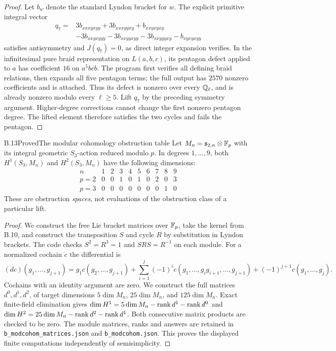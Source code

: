 \begin{proof}
Let $b_w$ denote the standard Lyndon bracket for $w$.
The explicit primitive integral vector
\[
 \begin{split}
 q_7={}&3b_{xxxyxyy}+3b_{xxxyyxy}+b_{xxyxyxy}\\
       &-3b_{xxyxyyy}-3b_{xxyyxyy}
        -3b_{xxyyyxy}-b_{xyxyxyy}
 \end{split}
\]
satisfies antisymmetry and $J(q_7)=0$, as direct integer
expansion verifies. In the infinitesimal pure braid
representation on $L(a,b,c)$, its pentagon defect applied
to $a$ has coefficient $16$ on $a^5bcb$.
The program first verifies all defining braid relations,
then expands all five pentagon terms; the full output
has $2570$ nonzero coefficients and is attached.
Thus its defect is nonzero over every $\mathbb Q_\ell$, and is
already nonzero modulo every $\ell\ge5$.
Lift $q_7$ by the preceding symmetry argument.
Higher-degree corrections cannot change the first
nonzero pentagon degree. The lifted element therefore
satisfies the two cycles and fails the pentagon.
\end{proof}

\begin{statement}{B.13}{Proved}{The modular cohomology obstruction table}
Let $M_n=\mathfrak s_{2,n}\otimes\mathbb F_p$ with its integral
geometric $S_3$-action reduced modulo $p$. In degrees
$1,\ldots,9$, both $H^1(S_3,M_n)$ and $H^2(S_3,M_n)$ have
the following dimensions:
\[
\begin{array}{c|rrrrrrrrr}
n&1&2&3&4&5&6&7&8&9\\ \hline
p=2&0&0&1&0&1&0&2&0&3\\
p=3&0&0&0&0&0&0&0&1&0
\end{array}
\]
These are obstruction \emph{spaces}, not evaluations of
the obstruction class of a particular lift.
\end{statement}
\begin{proof}
We construct the free Lie bracket matrices over $\mathbb F_p$,
take the kernel from B.10, and construct the transposition
$S$ and cycle $R$ by substitution in Lyndon brackets.
The code checks $S^2=R^3=1$ and $SRS=R^{-1}$ on each
module. For a normalized cochain $c$ the differential is
\[
 (dc)(g_1,\ldots,g_{j+1})=
 g_1c(g_2,\ldots,g_{j+1})
 +\sum_{i=1}^j(-1)^i
  c(g_1,\ldots,g_i g_{i+1},\ldots,g_{j+1})
 +(-1)^{j+1}c(g_1,\ldots,g_j).
\]
Cochains with an identity argument are zero. We construct
the full matrices $d^0,d^1,d^2$, of target dimensions
$5\dim M_n$, $25\dim M_n$, and $125\dim M_n$.
Exact finite-field elimination gives
$\dim H^1=5\dim M_n-\operatorname{rank} d^1-\operatorname{rank} d^0$ and
$\dim H^2=25\dim M_n-\operatorname{rank} d^2-\operatorname{rank} d^1$.
Both consecutive matrix products are checked to be zero.
The module matrices, ranks and answers are retained in
\texttt{b\_modcohom\_matrices.json} and
\texttt{b\_modcohom.json}. This proves the displayed
finite computations independently of semisimplicity.
\end{proof}

